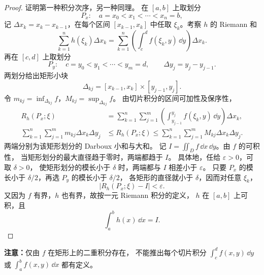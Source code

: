 \begin{proof}
证明第一种积分次序，另一种同理。
在 $[a,b]$ 上取划分
\[
P_x:\quad a=x_0<x_1<\cdots<x_n=b,
\]
记 $\Delta x_k=x_k-x_{k-1}$，在每个区间 $[x_{k-1},x_k]$
中任取 $\xi_k$。考察 $h$ 的 Riemann 和
\[
\sum_{k=1}^n h(\xi_k)\Delta x_k
=\sum_{k=1}^n\left(\int_c^d f(\xi_k,y)\,\dd y\right)\Delta x_k.
\]
再在 $[c,d]$ 上取划分
\[
P_y:\quad c=y_0<y_1<\cdots<y_m=d,
\qquad \Delta y_j=y_j-y_{j-1}.
\]
两划分给出矩形小块
\[
\Delta_{kj}=[x_{k-1},x_k]\times[y_{j-1},y_j].
\]
令 $m_{kj}=\inf_{\Delta_{kj}}f$，$M_{kj}=\sup_{\Delta_{kj}}f$。
由切片积分的区间可加性及保序性，
\[
\begin{aligned}
R_h(P_x;\xi)
&=\sum_{k=1}^n\sum_{j=1}^m
\left(\int_{y_{j-1}}^{y_j}f(\xi_k,y)\,\dd y\right)\Delta x_k,\\
\sum_{k=1}^n\sum_{j=1}^m m_{kj}\Delta x_k\Delta y_j
&\le R_h(P_x;\xi)
\le\sum_{k=1}^n\sum_{j=1}^m M_{kj}\Delta x_k\Delta y_j.
\end{aligned}
\]
两端分别为该矩形划分的 Darboux 小和与大和。
记 $\displaystyle I=\displaystyle\iint_D f\,\dd x\,\dd y$。由 $f$ 的可积性，
当矩形划分的最大直径趋于零时，两端都趋于 $I$。
具体地，任给 $\varepsilon>0$，可取 $\delta>0$，
使矩形划分的模长小于 $\delta$ 时，两端都与 $I$ 相差小于 $\varepsilon$。
只要 $P_x$ 的模长小于 $\delta/2$，再选 $P_y$ 的模长小于 $\delta/2$，
各矩形的直径就小于 $\delta$，因而对任意 $\xi_k$，
\[
|R_h(P_x;\xi)-I|<\varepsilon.
\]
又因为 $f$ 有界，$h$ 也有界，故按一元 Riemann 积分的定义，
$h$ 在 $[a,b]$ 上可积，且
\[
\int_a^b h(x)\,\dd x=I.
\]
\end{proof}

\textbf{注意：}仅由 $f$ 在矩形上的二重积分存在，
不能推出每个切片积分
$\displaystyle\int_c^d f(x,y)\,\dd y$ 或 $\displaystyle\int_a^b f(x,y)\,\dd x$ 都有定义。

